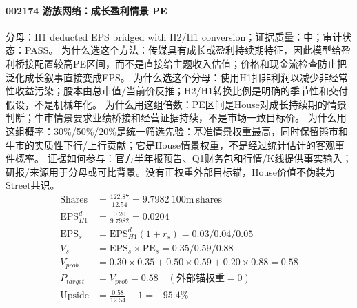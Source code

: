 \paragraph{002174 游族网络：成长盈利情景 PE}
分母：H1 deducted EPS bridged with H2/H1 conversion；证据质量：中；审计状态：PASS。
为什么选这个方法：传媒具有成长或盈利持续期特征，因此模型给盈利桥接配置较高PE区间，而不是直接给主题收入估值；价格和现金流检查防止把泛化成长叙事直接变成EPS。
为什么选这个分母：使用H1扣非利润以减少非经常性收益污染；股本由总市值/当前价反推；H2/H1转换比例是明确的季节性和交付假设，不是机械年化。
为什么用这组倍数：PE区间是House对成长持续期的情景判断；牛市情景要求业绩桥接和经营证据持续，不是市场一致目标价。
为什么用这组概率：30\%/50\%/20\%是统一筛选先验：基准情景权重最高，同时保留熊市和牛市的实质性下行/上行贡献；它是House情景权重，不是经过统计估计的客观事件概率。
证据如何参与：官方半年报预告、Q1财务包和行情/K线提供事实输入；研报/来源用于分母或可比背景。没有正权重外部目标锚，House价值不伪装为Street共识。
\begin{align*}
\mathrm{Shares} &= \frac{122.87}{12.54}=9.7982\ \mathrm{100m\ shares}\\
\mathrm{EPS}_{H1}^d &= \frac{0.20}{9.7982}=0.0204\\
\mathrm{EPS}_s &= \mathrm{EPS}_{H1}^d(1+r_s)=0.03/0.04/0.05\\
V_s &= \mathrm{EPS}_s\times \mathrm{PE}_s=0.35/0.59/0.88\\
V_{prob} &= 0.30\times 0.35+0.50\times 0.59+0.20\times 0.88=0.58\\
P_{target} &= V_{prob}=0.58\quad(\text{外部锚权重}=0)\\
\mathrm{Upside} &= \frac{0.58}{12.54}-1=-95.4\%\\
\end{align*}

